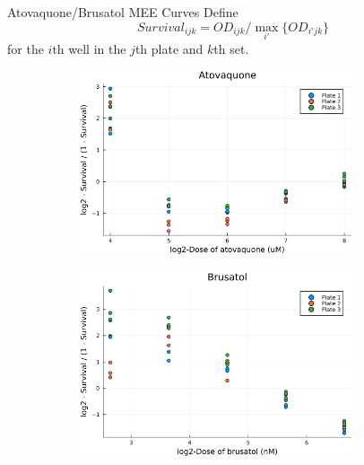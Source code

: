 \documentclass{beamer}
\begin{document}
\begin{frame}{Atovaquone/Brusatol MEE Curves}
    Define \[
        Survival_{ijk} = OD_{ijk} / \max_{i'}\{OD_{i'jk}\}
    \]
    for the $i$th well in the $j$th plate and $k$th set.
    \begin{figure}
        \centering
        \begin{subfigure}{0.5\textwidth}
            \centering
            \includegraphics[width=0.9\textwidth]{figs/ato-survival.png}
        \end{subfigure}%
        \begin{subfigure}{0.5\textwidth}
            \centering
            \includegraphics[width=0.9\textwidth]{figs/bru-survival.png}
        \end{subfigure}
    \end{figure}
\end{frame}
\end{document}
